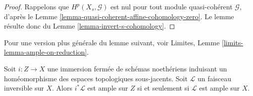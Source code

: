 \begin{proof}
Rappelons que $H^p(X_s, \mathcal{G})$ est nul pour tout module
quasi-cohérent $\mathcal{G}$, d'après le
Lemme \ref{lemma-quasi-coherent-affine-cohomology-zero}.
Le lemme résulte donc du
Lemme \ref{lemma-invert-s-cohomology}.
\end{proof}

\noindent
Pour une version plus générale du lemme suivant, voir
Limites, Lemme \ref{limits-lemma-ample-on-reduction}.

\begin{lemma}
\label{lemma-ample-on-reduction}
Soit $i : Z \to X$ une immersion fermée de schémas noethériens
induisant un homéomorphisme des espaces topologiques sous-jacents.
Soit $\mathcal{L}$ un faisceau inversible sur $X$.
Alors $i^*\mathcal{L}$ est ample sur $Z$ si et seulement si
$\mathcal{L}$ est ample sur $X$.
\end{lemma}


